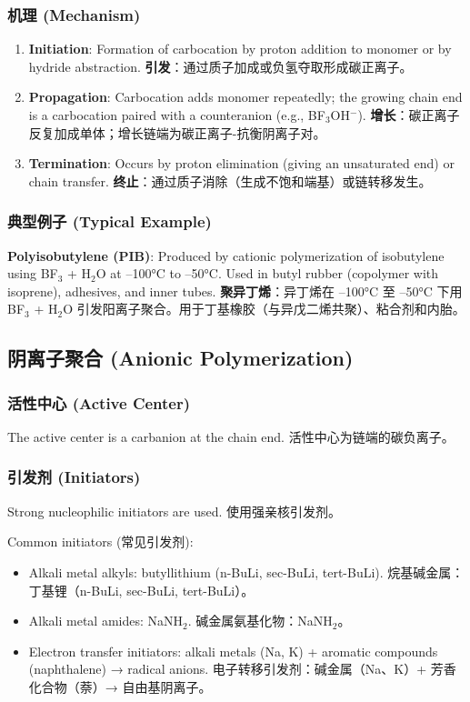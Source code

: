 \documentclass[12pt,a4paper]{ctexart}
\begin{document}
\subsubsection{机理 (Mechanism)}
\begin{enumerate}
    \item \textbf{Initiation}: Formation of carbocation by proton addition to monomer or by hydride abstraction.  
      \textbf{引发}：通过质子加成或负氢夺取形成碳正离子。
    \item \textbf{Propagation}: Carbocation adds monomer repeatedly; the growing chain end is a carbocation paired with a counteranion (e.g., BF$_3$OH$^-$).  
      \textbf{增长}：碳正离子反复加成单体；增长链端为碳正离子-抗衡阴离子对。
    \item \textbf{Termination}: Occurs by proton elimination (giving an unsaturated end) or chain transfer.  
      \textbf{终止}：通过质子消除（生成不饱和端基）或链转移发生。
\end{enumerate}

\subsubsection{典型例子 (Typical Example)}
\textbf{Polyisobutylene (PIB)}: Produced by cationic polymerization of isobutylene using BF$_3$ + H$_2$O at –100°C to –50°C. Used in butyl rubber (copolymer with isoprene), adhesives, and inner tubes.  
\textbf{聚异丁烯}：异丁烯在 –100°C 至 –50°C 下用 BF$_3$ + H$_2$O 引发阳离子聚合。用于丁基橡胶（与异戊二烯共聚）、粘合剂和内胎。

\subsection{阴离子聚合 (Anionic Polymerization)}

\subsubsection{活性中心 (Active Center)}
The active center is a carbanion at the chain end.  
活性中心为链端的碳负离子。

\subsubsection{引发剂 (Initiators)}
Strong nucleophilic initiators are used.  
使用强亲核引发剂。

Common initiators (常见引发剂):
\begin{itemize}
    \item Alkali metal alkyls: butyllithium (n-BuLi, sec-BuLi, tert-BuLi).  
      烷基碱金属：丁基锂（n-BuLi, sec-BuLi, tert-BuLi）。
    \item Alkali metal amides: NaNH$_2$.  
      碱金属氨基化物：NaNH$_2$。
    \item Electron transfer initiators: alkali metals (Na, K) + aromatic compounds (naphthalene) → radical anions.  
      电子转移引发剂：碱金属（Na、K）+ 芳香化合物（萘）→ 自由基阴离子。
\end{itemize}
\end{document}
